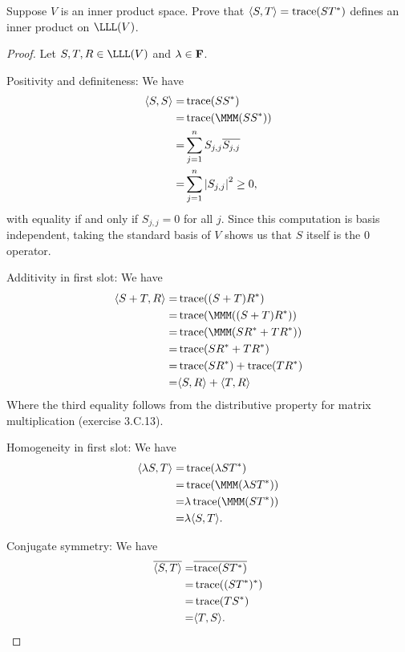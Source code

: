 \begin{exercise}{19}
  Suppose $V$ is an inner product space. Prove that $\langle S,T\rangle=\operatorname*{trace}(ST^\ast)$ defines an inner product on $\LLL(V)$.
\end{exercise}
\begin{proof}
 Let $S,T,R\in\LLL(V)$ and $\lambda\in\mathbf{F}$.

 Positivity and definiteness: We have
 \begin{align*}
     \brackets{S,S} =& \trace(SS^\ast)\\
     =& \trace(\MMM(SS^\ast))\\
     =& \sum_{j=1}^n S_{j,j}\overline{S_{j,j}}\\
     =& \sum_{j=1}^n\absoluteValue{S_{j,j}}^2 \geq 0,
 \end{align*}
 with equality if and only if $S_{j,j}=0$ for all $j$. Since this computation is basis independent, taking the standard basis of $V$ shows us that $S$ itself is the 0 operator.

 Additivity in first slot: We have
 \begin{align*}
     \brackets{S+T,R} =& \trace((S+T)R^\ast)\\
     =& \trace(\MMM((S+T)R^\ast))\\
     =& \trace(\MMM(SR^\ast+TR^\ast))\\
     =& \trace(SR^\ast+TR^\ast)\\
     =& \trace(SR^\ast)+\trace(TR^\ast)\\
     =& \brackets{S,R}+\brackets{T,R}
 \end{align*}
 Where the third equality follows from the distributive property for matrix multiplication (exercise 3.C.13).

 Homogeneity in first slot: We have
 \begin{align*}
     \brackets{\lambda S,T} =& \trace(\lambda ST^\ast)\\
     =& \trace(\MMM(\lambda ST^\ast))\\
     =& \lambda\trace(\MMM(ST^\ast))\\
     =& \lambda\brackets{S,T}.
 \end{align*}

 Conjugate symmetry: We have
 \begin{align*}
     \overline{\langle S,T\rangle} =& \overline{\operatorname*{trace}(ST^\ast)}\\
     =& \operatorname*{trace}((ST^\ast)^\ast)\\
     =& \operatorname*{trace}(TS^\ast)\\
     =& \langle T,S\rangle.
 \end{align*}
\end{proof}